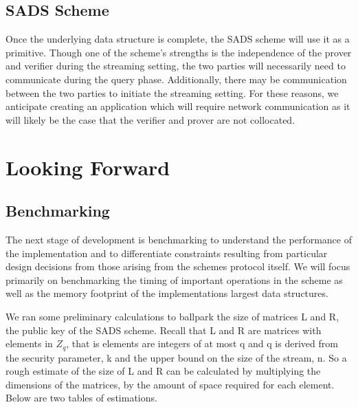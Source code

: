 \documentclass[11pt, letterpaper, oneside]{article}
\begin{document}
	\subsection{SADS Scheme}

	Once the underlying data structure is complete, the SADS scheme will use it as a primitive.
	Though one of the scheme's strengths is the independence of the prover and verifier during the streaming setting, the two parties will necessarily need to communicate during the query phase.
	Additionally, there may be communication between the two parties to initiate the streaming setting.
	For these reasons, we anticipate creating an application which will require network communication as it will likely be the case that the verifier and prover are not collocated.



\section{Looking Forward}

	\subsection{ Benchmarking }
	
	The next stage of development is benchmarking to understand the performance of the implementation and to differentiate constraints resulting from particular design decisions from those arising from the schemes protocol itself.
	We will focus primarily on benchmarking the timing of important operations in the scheme as well as the memory footprint of the implementations largest data structures.
	
	We ran some preliminary calculations to ballpark the size of matrices L and R, the public key of the SADS scheme.
	Recall that L and R are matrices with elements in $Z_q$, that is elements are integers of at most q and q is derived from the security parameter, k and the upper bound on the size of the stream, n.
	So a rough estimate of the size of L and R can be calculated by multiplying the dimensions of the matrices, by the amount of space required for each element.
	Below are two tables of estimations.
	
\end{document}
